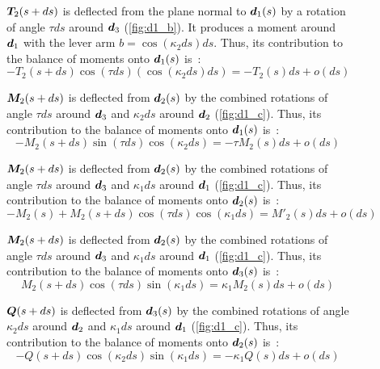 \begin{figure}[p]
\begin{fullpage}
	$\boldsymbol{T}_2(s+ds)$ is deflected from the plane normal to $\boldsymbol{d}_1(s)$ by a rotation of angle $\tau ds$ around $\boldsymbol{d}_3$ (\cref{fig:d1_b}). It produces a moment around $\boldsymbol{d}_1$ with the lever arm $b =  \cos(\kappa_2 ds) ds$. Thus, its contribution to the balance of moments onto $\boldsymbol{d}_1(s)$ is~: 
	\begin{equation*}
		-T_2(s+ds) \cos(\tau ds) (\cos(\kappa_2 ds) ds) = -T_2(s) ds + o(ds)
	\end{equation*}
	
	$\boldsymbol{M}_2(s+ds)$ is deflected from $\boldsymbol{d}_2(s)$ by the combined rotations of angle $\tau ds$ around $\boldsymbol{d}_3$ and $\kappa_2 ds$ around $\boldsymbol{d}_2$ (\cref{fig:d1_c}). Thus, its contribution to the balance of moments onto $\boldsymbol{d}_1(s)$ is~: 
	\begin{equation*}
		-M_2(s+ds) \sin(\tau ds) \cos(\kappa_2 ds) = -\tau M_2 (s) ds + o(ds)
	\end{equation*}	
	
	$\boldsymbol{M}_2(s+ds)$ is deflected from $\boldsymbol{d}_2(s)$ by the combined rotations of angle $\tau ds$ around $\boldsymbol{d}_3$ and $\kappa_1 ds$ around $\boldsymbol{d}_1$ (\cref{fig:d1_c}). Thus, its contribution to the balance of moments onto $\boldsymbol{d}_2(s)$ is~: 
	\begin{equation*}
		-M_2(s) + M_2(s+ds) \cos(\tau ds) \cos(\kappa_1 ds) = M'_2 (s) ds + o(ds)
	\end{equation*}
	
	$\boldsymbol{M}_2(s+ds)$ is deflected from $\boldsymbol{d}_2(s)$ by the combined rotations of angle $\tau ds$ around $\boldsymbol{d}_3$ and $\kappa_1 ds$ around $\boldsymbol{d}_1$ (\cref{fig:d1_c}). Thus, its contribution to the balance of moments onto $\boldsymbol{d}_3(s)$ is~: 
	\begin{equation*}
		M_2(s+ds) \cos(\tau ds) \sin(\kappa_1 ds) = \kappa_1 M_2 (s) ds + o(ds)
	\end{equation*}	
	
	$\boldsymbol{Q}(s+ds)$ is deflected from $\boldsymbol{d}_3(s)$ by the combined rotations of angle $\kappa_2 ds$ around $\boldsymbol{d}_2$ and $\kappa_1 ds$ around $\boldsymbol{d}_1$ (\cref{fig:d1_c}). Thus, its contribution to the balance of moments onto $\boldsymbol{d}_2(s)$ is~: 
	\begin{equation*}
		-Q(s+ds) \cos(\kappa_2 ds) \sin(\kappa_1 ds) = -\kappa_1 Q(s) ds + o(ds)
	\end{equation*}	
	  \end{fullpage}
\end{figure}

 
